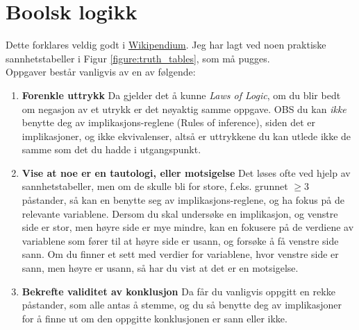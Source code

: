 \section{Boolsk logikk}

Dette forklares veldig godt i \href{https://www.wikipendium.no/MA0301_Elementary_Discrete_Mathematics#logic}{Wikipendium}.
Jeg har lagt ved noen praktiske sannhetstabeller i Figur \ref{figure:truth_tables}, som må pugges.\\

\noindent Oppgaver består vanligvis av en av følgende:
\begin{enumerate}
    \item \textbf{Forenkle uttrykk} Da gjelder det å kunne \textit{Laws of Logic}, om du blir
    bedt om negasjon av et utrykk er det nøyaktig samme oppgave.
    OBS du kan \textit{ikke} benytte deg av implikasjons-reglene (Rules of inference),
    siden det er implikasjoner, og ikke ekvivalenser, altså er uttrykkene du kan utlede ikke 
    de samme som det du hadde i utgangspunkt. 
    \item \textbf{Vise at noe er en tautologi, eller motsigelse} Det løses ofte ved hjelp av 
    sannhetstabeller, men om de skulle bli for store, f.eks. grunnet $\geq 3$ påstander, så kan en 
    benytte seg av implikasjons-reglene, og ha fokus på de relevante variablene. Dersom du skal undersøke en implikasjon,
    og venstre side er stor, men høyre side er mye mindre, kan en fokusere på de verdiene av 
    variablene som fører til at høyre side er usann, og forsøke å få venstre side sann. Om du finner et sett med
    verdier for variablene, hvor venstre side er sann, men høyre er usann, så har du vist at det er en motsigelse.
    \item \textbf{Bekrefte validitet av konklusjon} Da får du vanligvis oppgitt en rekke påstander, som alle antas å stemme,
    og du så benytte deg av implikasjoner for å finne ut om den oppgitte konklusjonen er sann eller ikke.
\end{enumerate}

